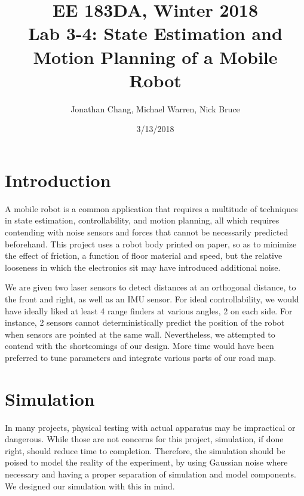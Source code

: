 \documentclass[11pt]{article}
\newcommand{\cnum}{EE 183DA}
\newcommand{\ced}{Winter 2018}
\newcommand{\ctitle}[2]{\title{\vspace{-0.5in}\cnum, \ced\\Lab #1: #2}}
\begin{document}
\ctitle{3-4}{State Estimation and Motion Planning of a Mobile Robot}
\author{Jonathan Chang, Michael Warren, Nick Bruce}
\date{3/13/2018}
\maketitle
\vspace{-0.75in}

\vspace{5mm}

\section{Introduction}

A mobile robot is a common application that requires a multitude of techniques in state estimation, controllability, and motion planning, all which requires contending with noise sensors and forces that cannot be necessarily predicted beforehand. This project uses a robot body printed on paper, so as to minimize the effect of friction, a function of floor material and speed, but the relative looseness in which the electronics sit may have introduced additional noise.

We are given two laser sensors to detect distances at an orthogonal distance, to the front and right, as well as an IMU sensor. For ideal controllability, we would have ideally liked at least 4 range finders at various angles, 2 on each side. For instance, 2 sensors cannot deterministically predict the position of the robot when sensors are pointed at the same wall. Nevertheless, we attempted to contend with the shortcomings of our design. More time would have been preferred to tune parameters and integrate various parts of our road map.

\section{Simulation}

In many projects, physical testing with actual apparatus may be impractical or dangerous. While those are not concerns for this project, simulation, if done right, should reduce time to completion. Therefore, the simulation should be poised to model the reality of the experiment, by using Gaussian noise where necessary and having a proper separation of simulation and model components. We designed our simulation with this in mind.
\end{document}

